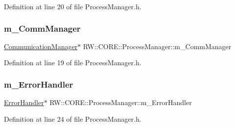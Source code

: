 Definition at line 20 of file Process\+Manager.\+h.

\hypertarget{class_r_w_1_1_c_o_r_e_1_1_process_manager_ae2148c7df93ab1533c4d0370fbd7c60a}{}\label{class_r_w_1_1_c_o_r_e_1_1_process_manager_ae2148c7df93ab1533c4d0370fbd7c60a} 
\subsubsection{\texorpdfstring{m\+\_\+\+Comm\+Manager}{m\_CommManager}}
{\footnotesize\ttfamily \hyperlink{class_r_w_1_1_c_o_r_e_1_1_communication_manager}{Communication\+Manager}$\ast$ R\+W\+::\+C\+O\+R\+E\+::\+Process\+Manager\+::m\+\_\+\+Comm\+Manager\hspace{0.3cm}{\ttfamily [private]}}



Definition at line 19 of file Process\+Manager.\+h.

\hypertarget{class_r_w_1_1_c_o_r_e_1_1_process_manager_ab3bb733bfe0da01794bd4b8674ff8ef9}{}\label{class_r_w_1_1_c_o_r_e_1_1_process_manager_ab3bb733bfe0da01794bd4b8674ff8ef9} 
\subsubsection{\texorpdfstring{m\+\_\+\+Error\+Handler}{m\_ErrorHandler}}
{\footnotesize\ttfamily \hyperlink{class_r_w_1_1_c_o_r_e_1_1_error_handler}{Error\+Handler}$\ast$ R\+W\+::\+C\+O\+R\+E\+::\+Process\+Manager\+::m\+\_\+\+Error\+Handler\hspace{0.3cm}{\ttfamily [private]}}



Definition at line 24 of file Process\+Manager.\+h.

\hypertarget{class_r_w_1_1_c_o_r_e_1_1_process_manager_aa4122a26664468838c764c93532740fa}{}\label{class_r_w_1_1_c_o_r_e_1_1_process_manager_aa4122a26664468838c764c93532740fa} 
